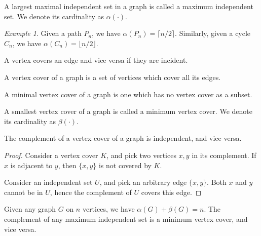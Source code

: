 \documentclass[11pt]{article}
\theoremstyle{definition}
\theoremstyle{remark}
\newtheorem*{example}{Example}
\numberwithin{equation}{section}
\begin{document}
    \begin{definition}
        A largest maximal independent set in a graph is called a maximum independent
        set. We denote its cardinality as $\alpha(\cdot)$.
    \end{definition}
    \begin{example}
        Given a path $P_n$, we have $\alpha(P_n) = \lceil n / 2\rceil$. Similarly,
        given a cycle $C_n$, we have $\alpha(C_n) = \lfloor n / 2\rfloor$.
    \end{example}

    \begin{definition}
        A vertex covers an edge and vice versa if they are incident.
    \end{definition}

    \begin{definition}
        A vertex cover of a graph is a set of vertices which cover all its edges.
    \end{definition}

    \begin{definition}
        A minimal vertex cover of a graph is one which has no vertex cover as a
        subset.
    \end{definition}

    \begin{definition}
        A smallest vertex cover of a graph is called a minimum vertex cover. We
        denote its cardinality as $\beta(\cdot)$.
    \end{definition}

    \begin{lemma}
        The complement of a vertex cover of a graph is independent, and vice versa.
    \end{lemma}
    \begin{proof}
        Consider a vertex cover $K$, and pick two vertices $x, y$ in its complement.
        If $x$ is adjacent to $y$, then $\{x, y\}$ is not covered by $K$.

        Consider an independent set $U$, and pick an arbitrary edge $\{x, y\}$. Both
        $x$ and $y$ cannot be in $U$, hence the complement of $U$ covers this edge.
    \end{proof}

    \begin{corollary}
        Given any graph $G$ on $n$ vertices, we have $\alpha(G) + \beta(G) = n$. The
        complement of any maximum independent set is a minimum vertex cover, and vice
        versa.
    \end{corollary}
\end{document}
